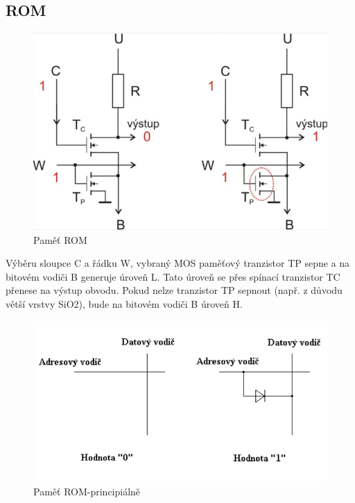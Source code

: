 \subsection{ROM}
    \begin{figure}[h]
   \begin{center}
     \includegraphics[scale=0.4]{images/ROM.png}
   \end{center}
   \caption{Paměť ROM}
  \end{figure}
Výběru sloupce C a řádku W, vybraný MOS paměťový tranzistor TP sepne a na
bitovém vodiči B generuje úroveň L. Tato úroveň se přes spínací tranzistor TC
přenese na výstup obvodu. Pokud nelze tranzistor TP sepnout (např. z důvodu větší vrstvy SiO2), bude na bitovém vodiči B úroveň H.
    \begin{figure}[h]
   \begin{center}
     \includegraphics[scale=0.4]{images/ROM2.png}
   \end{center}
   \caption{Paměť ROM-principiálně}
  \end{figure}
  \newpage

